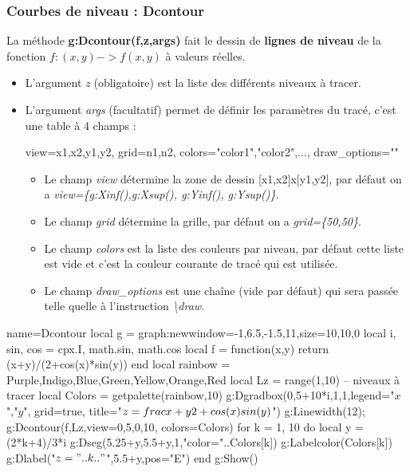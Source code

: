 \documentclass[%
10pt,%
a4paper,%
french,%
]%
{article}%
\newenvironment*{demo}[2][]{%
\gdef\legende{#2}%
\gdef\lab{#1}%
\bgroup
\VerbatimOut{\jobname.tmp}%
}%
{%
\endVerbatimOut%
\egroup%
\inputminted[ignorelexererrors=true,breaklines,bgcolor=Beige,linenos,numbersep=6pt,frame=single,fontsize=\footnotesize]{Lua}{\jobname.tmp}%
\begin{minipage}{0.9\textwidth}
\begin{center}
\captionof{figure}{\legende}\label{\lab}%
%
\end{center}
\end{minipage}
}
\begin{document}
\subsubsection{Courbes de niveau : Dcontour}

La méthode \textbf{g:Dcontour(f,z,args)} fait le dessin de \textbf{lignes de niveau} de la fonction \(f: (x,y) -> f(x,y)\) à valeurs réelles.

\begin{itemize}
  \item L'argument \emph{z} (obligatoire) est la liste des différents niveaux à tracer.
  \item L'argument \emph{args} (facultatif) permet de définir les paramètres du tracé, c'est une table à 4 champs :
  
  \begin{TeXcode}
    { view={x1,x2,y1,y2}, grid={n1,n2}, colors={"color1","color2",...}, draw_options="" }
  \end{TeXcode}

    \begin{itemize}
        \item Le champ \emph{view} détermine la zone de dessin {[}x1,x2{]}x{[}y1,y2{]}, par défaut on a \emph{view=\{g:Xinf(),g:Xsup(), g:Yinf(), g:Ysup()\}}.
        \item Le champ \emph{grid} détermine la grille, par défaut on a \emph{grid=\{50,50\}}.
        \item Le champ \emph{colors} est la liste des couleurs par niveau, par défaut cette liste est vide et c'est la couleur courante de tracé qui est utilisée.
        \item Le champ \emph{draw\_options} est une chaîne (vide par défaut) qui sera passée telle quelle à l'instruction \emph{\textbackslash draw}.
    \end{itemize}
\end{itemize}

\begin{demo}{Exemple avec Dcontour}
\begin{luadraw}{name=Dcontour}
local g = graph:new{window={-1,6.5,-1.5,11},size={10,10,0}}
local i, sin, cos = cpx.I, math.sin, math.cos
local f = function(x,y) return (x+y)/(2+cos(x)*sin(y)) end
local rainbow = {Purple,Indigo,Blue,Green,Yellow,Orange,Red}
local Lz = range(1,10) -- niveaux à tracer
local Colors = getpalette(rainbow,10)
g:Dgradbox({0,5+10*i,1,1},{legend={"$x$","$y$"}, grid=true, title="$z=\\frac{x+y}{2+\\cos(x)\\sin(y)}$"})
g:Linewidth(12); g:Dcontour(f,Lz,{view={0,5,0,10}, colors=Colors})
for k = 1, 10 do
    local y = (2*k+4)/3*i
    g:Dseg({5.25+y,5.5+y},1,"color="..Colors[k])
    g:Labelcolor(Colors[k])
    g:Dlabel("$z="..k.."$",5.5+y,{pos="E"})
end
g:Show()
\end{luadraw}
\end{demo}
\end{document}
